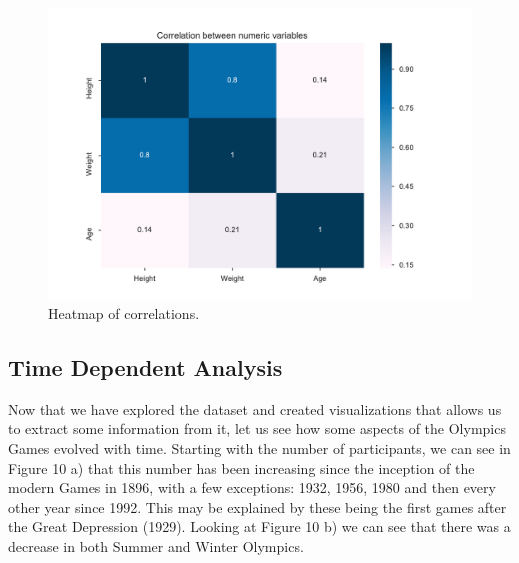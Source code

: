 \documentclass[11pt]{article} %
\begin{document}
\begin{figure}
    \centering
    \includegraphics[scale=0.6]{Corr_heatmap.pdf}
    \caption{Heatmap of correlations.}
\end{figure}

\subsection{Time Dependent Analysis}

Now that we have explored the dataset and created visualizations that allows us to extract some information from it, let us see how some aspects of the Olympics Games evolved with time. Starting with the number of participants, we can see in Figure 10 a) that this number has been increasing since the inception of the modern Games in 1896, with a few exceptions: 1932, 1956, 1980 and then every other year since 1992. This may be explained by these being the first games after the Great Depression (1929). Looking at Figure 10 b) we can see that there was a decrease in both Summer and Winter Olympics.
\end{document}
